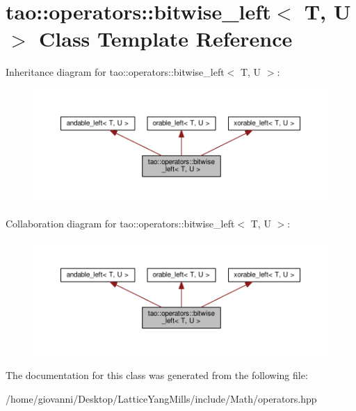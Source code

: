 \hypertarget{classtao_1_1operators_1_1bitwise__left}{}\section{tao\+:\+:operators\+:\+:bitwise\+\_\+left$<$ T, U $>$ Class Template Reference}
\label{classtao_1_1operators_1_1bitwise__left}


Inheritance diagram for tao\+:\+:operators\+:\+:bitwise\+\_\+left$<$ T, U $>$\+:\nopagebreak
\begin{figure}[H]
\begin{center}
\leavevmode
\includegraphics[width=350pt]{classtao_1_1operators_1_1bitwise__left__inherit__graph}
\end{center}
\end{figure}


Collaboration diagram for tao\+:\+:operators\+:\+:bitwise\+\_\+left$<$ T, U $>$\+:\nopagebreak
\begin{figure}[H]
\begin{center}
\leavevmode
\includegraphics[width=350pt]{classtao_1_1operators_1_1bitwise__left__coll__graph}
\end{center}
\end{figure}


The documentation for this class was generated from the following file\+:\begin{DoxyCompactItemize}
\item 
/home/giovanni/\+Desktop/\+Lattice\+Yang\+Mills/include/\+Math/operators.\+hpp\end{DoxyCompactItemize}
